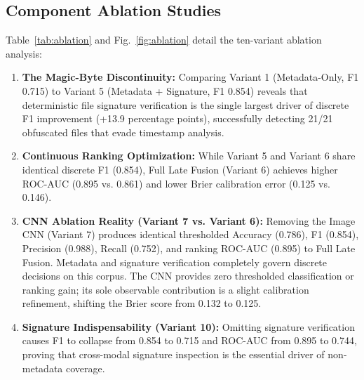 \documentclass[conference]{IEEEtran}
\begin{document}
\subsection{Component Ablation Studies}
Table~\ref{tab:ablation} and Fig.~\ref{fig:ablation} detail the ten-variant ablation analysis:
\begin{enumerate}
    \item \textbf{The Magic-Byte Discontinuity:} Comparing Variant 1 (Metadata-Only, F1 0.715) to Variant 5 (Metadata + Signature, F1 0.854) reveals that deterministic file signature verification is the single largest driver of discrete F1 improvement (+13.9 percentage points), successfully detecting 21/21 obfuscated files that evade timestamp analysis.
    \item \textbf{Continuous Ranking Optimization:} While Variant 5 and Variant 6 share identical discrete F1 (0.854), Full Late Fusion (Variant 6) achieves higher ROC-AUC (0.895 vs. 0.861) and lower Brier calibration error (0.125 vs. 0.146).
    \item \textbf{CNN Ablation Reality (Variant 7 vs. Variant 6):} Removing the Image CNN (Variant 7) produces identical thresholded Accuracy (0.786), F1 (0.854), Precision (0.988), Recall (0.752), and ranking ROC-AUC (0.895) to Full Late Fusion. Metadata and signature verification completely govern discrete decisions on this corpus. The CNN provides zero thresholded classification or ranking gain; its sole observable contribution is a slight calibration refinement, shifting the Brier score from 0.132 to 0.125.
    \item \textbf{Signature Indispensability (Variant 10):} Omitting signature verification causes F1 to collapse from 0.854 to 0.715 and ROC-AUC from 0.895 to 0.744, proving that cross-modal signature inspection is the essential driver of non-metadata coverage.
\end{enumerate}
\end{document}
